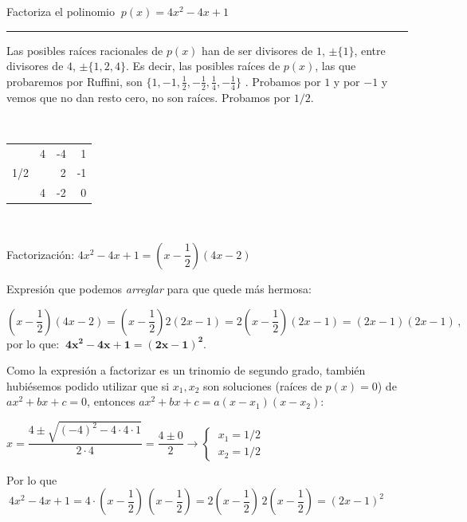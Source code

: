 \vspace{5mm}

\begin{miejercicio}

Factoriza el polinomio $\ p(x)=4x^2-4x+1$

\rule{250pt}{0.1pt}

\begin{multicols}{2}
 Las posibles raíces racionales de $p(x)$ han de ser divisores de $1$, $\pm\{1\}$, entre divisores de $4$, $\pm\{1,2,4\}$. Es decir, las posibles raíces de $p(x)$, las que probaremos por Ruffini, son $\{1,-1,\frac 1 2,-\frac 1 2, \frac 1 4 ,-\frac 1 4 \}$	. Probamos por $1$ y por $-1$ y vemos que no dan resto cero, no son raíces. Probamos por $1/2$.
 
$\quad$ 
 
\begin{table}[H]
\centering
\begin{tabular}{r|rrr}
 & 4 & -4 & 1 \\
1/2 &  & 2 & -1 \\ \hline
 & 4 & \multicolumn{1}{r|}{-2} & 0 \\ \cline{4-4} 
\end{tabular}
\end{table}

$\quad$ 
\end{multicols}
Factorización: $4x^2-4x+1=\left(x-\dfrac 12 \right)(4x-2)$ 

\vspace{2mm} Expresión que podemos \emph{arreglar} para que quede más hermosa:

\vspace{3mm} $\left(x-\dfrac 12 \right)(4x-2)=\left(x-\dfrac 12 \right)2(2x-1)=2\left(x-\dfrac 12 \right)(2x-1)=(2x-1)(2x-1)\, , \ $ por lo que: $\ \boldsymbol{4x^2-4x+1=(2x-1)^2}$.

\vspace{4mm} Como la expresión a factorizar es un trinomio de segundo grado, también hubiésemos podido utilizar que si $x_1,x_2$ son soluciones (raíces de $p(x)=0$) de $ax^2+bx+c=0$, entonces $ax^2+bx+c=a(x-x_1)(x-x_2)$:

\vspace{2mm} $x=\dfrac{4\pm \sqrt{(-4)^2-4\cdot 4 \cdot 1}}{2\cdot 4}=\dfrac{4\pm 0}{2} \to \begin{cases} \ x_1=1/2\\ \ x_2=1/2 \end{cases}$

\vspace{2mm} Por lo que $\ 4x^2-4x+1=4\cdot \left(x-\dfrac 12 \right) \, \left(x-\dfrac 12 \right) = 2\left(x-\dfrac 12 \right)\, 2\left(x-\dfrac 12 \right)=(2x-1)^2$
\end{miejercicio}


